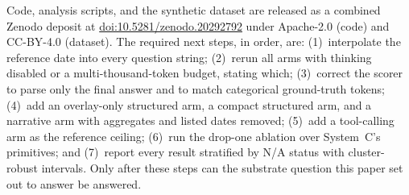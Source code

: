 Code, analysis scripts, and the synthetic dataset are released as a combined Zenodo
deposit at \href{https://doi.org/10.5281/zenodo.20292792}{doi:10.5281/zenodo.20292792}
under Apache-2.0 (code) and CC-BY-4.0 (dataset).  The required next steps, in order, are:
(1)~interpolate the reference date into every question string; (2)~rerun all arms with
thinking disabled or a multi-thousand-token budget, stating which; (3)~correct the scorer
to parse only the final answer and to match categorical ground-truth tokens; (4)~add an
overlay-only structured arm, a compact structured arm, and a narrative arm with
aggregates and listed dates removed; (5)~add a tool-calling arm as the reference ceiling;
(6)~run the drop-one ablation over System~C's primitives; and (7)~report every result
stratified by N/A status with cluster-robust intervals.  Only after these steps can the
substrate question this paper set out to answer be answered.

